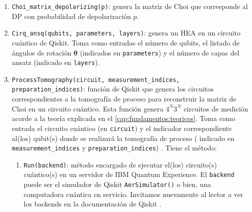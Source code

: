 \documentclass[letterpaper,12pt]{thesisECFM}
\theoremstyle{plain}
\theoremstyle{definition}
\theoremstyle{definition}
\theoremstyle{remark}
\newcommand{\1}{\mathbb{1}}
\begin{document}
\begin{enumerate}
    \item \texttt{Choi\_matrix\_depolarizing(p)}: genera la matriz de Choi que
corresponde al DP con probabilidad de depolarización $p$.

    \item \texttt{Cirq\_ansq(qubits, parameters, layers)}: genera un HEA en un circuito cuántico de Qiskit. Toma como entradas el número de qubits, el listado de ángulos de rotación $\bm{\theta}$ (indicados en \texttt{parameters}) y el número de capas del ansatz (indicado en \texttt{layers}).
    
    \item \texttt{ProcessTomography(circuit, measurement\_indices,
preparation\_indices)}: función de Qiskit que genera los circuitos
correspondientes a la tomografía de proceso para reconstruir la matriz de Choi
en un circuito cuántico. Esta función genera $4^N3^N$ circuitos de medición
acorde a la teoría explicada en el \autoref{cap:fundamentos:teoricos}. Toma como entrada el circuito
cuántico (en  \texttt{circuit})  y el indicador correspondiente al(los)
qubit(s) donde se realizará la tomografía de proceso ( indicado en
\texttt{measurement\_indices} y \texttt{preparation\_indices}) . Tiene el
método: 
    \begin{enumerate}
	\item \texttt{Run(backend)}: método encargado de ejecutar el(los)
circuito(s) cuántico(s) en un servidor de IBM Quantum Experience. El
\texttt{backend} puede ser el simulador de Qiskit  \texttt{AerSimulator()} o
bien, una computadora cuántica en servicio. Invitamos nuevamente al lector a
ver los backends en la documentación de Qiskit \cite{Qiskit_documentation}. 
    \end{enumerate}


\end{enumerate}
\end{document}
